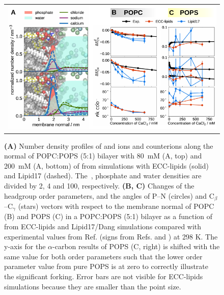\documentclass[journal=jctcce,manuscript=article]{achemso}
\newlength{\figwidth}
\newlength{\figwidthfull}
\begin{document}
\begin{figure}[tbp!] 
  \centering 
  \begin{tabular}{ c }
  \includegraphics[width=\figwidthfull]{../img/deltaOP_cacl_PC-PS.pdf} 
  \end{tabular}
  \caption{
    \label{fig:cacl-dens_PCPS} 
    \label{fig:delta_ordPar_CaCl_PCPS} 
    \textbf{(A)}
    Number density profiles of  and  ions and  counterions 
    along the normal of POPC:POPS (5:1) bilayer with 80~mM (A, top) and 200~mM (A, bottom)
    of  from simulations with ECC-lipids (solid) and Lipid17 (dashed). 
    The~, phosphate and water densities are divided by 2, 4 and 100, respectively.  
    \textbf{(B, C)}
    Changes of the headgroup order parameters, and the angles of P--N (circles) and C$_\beta$--C$_\gamma$ (stars) vectors 
    with respect to the membrane normal of POPC (B) and POPS (C) in a POPC:POPS (5:1) bilayer 
    as a function of  from ECC-lipids and Lipid17/Dang simulations 
    compared with experimental values from Ref.  (signs from Refs.  and ) at 298 K.
    The y-axis for the $\alpha$-carbon results of POPS (C, right) is shifted
    with the same value for both order parameters such that the lower order
    parameter value from pure POPS is at zero to correctly illustrate the significant forking.
    Error bars are not visible for ECC-lipids simulations because they are smaller than the point size.
  }
\end{figure}
\end{document}
